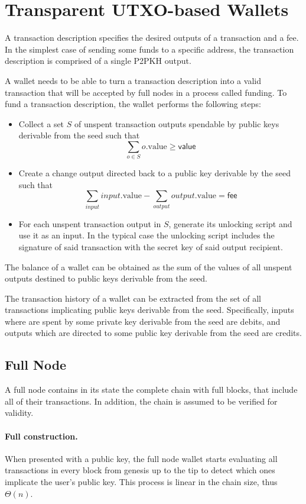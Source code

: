 \section{Transparent UTXO-based Wallets}
\label{transparent-utxo}

A transaction description specifies the desired outputs of a transaction and a fee. In the simplest case of sending some funds to a specific address, the transaction description is comprised of a single P2PKH output.

A wallet needs to be able to turn a transaction description into a valid transaction that will be accepted by full nodes in a process called funding. To fund a transaction description, the wallet performs the following steps:

\begin{itemize}
    \item Collect a set $S$ of unspent transaction outputs spendable by public keys derivable from the seed such that $$\sum_{o \in S} o.\text{value} \ge \textsf{value}$$
    \item Create a change output directed back to a public key derivable by the seed such that
    $$\sum_{input} input.\text{value} - \sum_{output} output.\text{value} = \textsf{fee}$$
    \item For each unspent transaction output in $S$, generate its unlocking script and use it as an input. In the typical case the unlocking script includes the signature of said transaction with the secret key of said output recipient.
\end{itemize}

The balance of a wallet can be obtained as the sum of the values of all unspent outputs destined to public keys derivable from the seed.

The transaction history of a wallet can be extracted from the set of all transactions implicating public keys derivable from the seed. Specifically, inputs where are spent by some private key derivable from the seed are debits, and outputs which are directed to some public key derivable from the seed are credits.

\subsection{Full Node}
A full node contains in its state the complete chain with full blocks, that include all of their transactions. In addition, the chain is assumed to be verified for validity.

\paragraph{Full construction.}
When presented with a public key, the full node wallet starts evaluating all transactions in every block from genesis up to the tip to detect which ones implicate the user's public key. This process is linear in the chain size, thus $\Theta(n)$.

